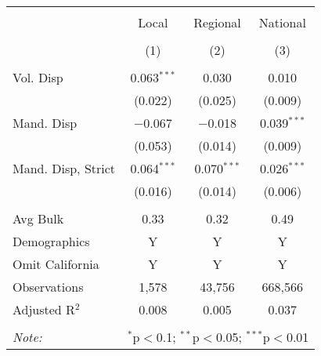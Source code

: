 
\begin{table}[!htbp] \centering 
  \caption{} 
  \label{} 
\begin{tabular}{@{\extracolsep{5pt}}lccc} 
\\[-1.8ex]\hline 
\hline \\[-1.8ex] 
 & Local & Regional & National \\ 
\\[-1.8ex] & (1) & (2) & (3)\\ 
\hline \\[-1.8ex] 
 Vol. Disp & 0.063$^{***}$ & 0.030 & 0.010 \\ 
  & (0.022) & (0.025) & (0.009) \\ 
  Mand. Disp & $-$0.067 & $-$0.018 & 0.039$^{***}$ \\ 
  & (0.053) & (0.014) & (0.009) \\ 
  Mand. Disp, Strict & 0.064$^{***}$ & 0.070$^{***}$ & 0.026$^{***}$ \\ 
  & (0.016) & (0.014) & (0.006) \\ 
 \hline \\[-1.8ex] 
Avg Bulk & 0.33 & 0.32 & 0.49 \\ 
Demographics & Y & Y & Y \\ 
Omit California & Y & Y & Y \\ 
Observations & 1,578 & 43,756 & 668,566 \\ 
Adjusted R$^{2}$ & 0.008 & 0.005 & 0.037 \\ 
\hline 
\hline \\[-1.8ex] 
\textit{Note:}  & \multicolumn{3}{l}{$^{*}$p$<$0.1; $^{**}$p$<$0.05; $^{***}$p$<$0.01} \\ 
\end{tabular} 
\end{table} 
